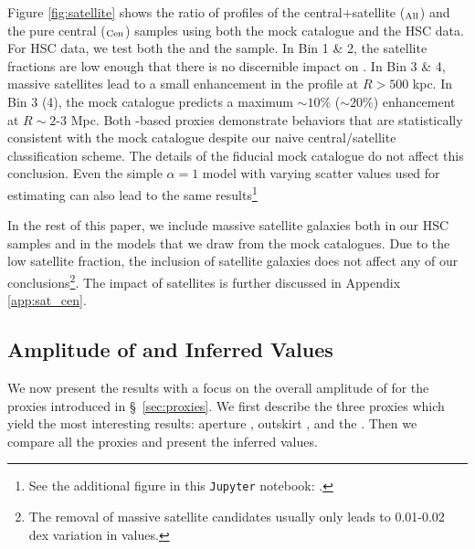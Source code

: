 \documentclass[fleqn,usenatbib,useAMS]{mnras}
\begin{document}
    Figure \ref{fig:satellite} shows the ratio of \dsigma{} profiles of the central$+$satellite 
    (\dsigma{}$_{\rm All}$) and the pure central (\dsigma{}$_{\rm Cen}$) samples using both 
    the mock catalogue and the HSC data.
    For HSC data, we test both the  and the  sample. 
    In Bin 1 \& 2, the satellite fractions are low enough that there is no discernible impact on
    \dsigma{}.
    In Bin 3 \& 4, massive satellites lead to a small enhancement in the \dsigma{} profile at $R >
    500$ kpc.
    In Bin 3 (4), the mock catalogue predicts a maximum $\sim 10$\% ($\sim 20$\%) enhancement at $R
    \sim 2$-3 Mpc.
    Both \mstar{}-based proxies demonstrate behaviors that are statistically consistent with the
    mock catalogue despite our naive central/satellite classification scheme.
    The details of the fiducial mock catalogue do not affect this conclusion. 
    Even the simple $\alpha=1$ model with varying scatter values used for estimating
    \scatterMhaloObsSym{} can also lead to the same results\footnote{See the additional figure in
    this \texttt{Jupyter} notebook: 
    \href{https://github.com/dr-guangtou/jianbing/blob/master/notebooks/figure/fig4.ipynb}{\faGithub}.}

    In the rest of this paper, we include massive satellite galaxies both in our HSC samples and in
    the models that we draw from the mock catalogues. 
    Due to the low satellite fraction, the inclusion of satellite galaxies does not affect any 
    of our conclusions\footnote{The removal of massive satellite candidates usually only leads to
    0.01-0.02 dex variation in \scatterMhaloObsSym{} values.}.
    The impact of satellites is further discussed in Appendix \ref{app:sat_cen}.
    
\subsection{Amplitude of \texorpdfstring{\dsigma{}}{DSigma} and Inferred \texorpdfstring{\sigmvir{}}{SigMvir} Values}
    \label{sec:topn_results}

    We now present the \topn{} results with a focus on the overall amplitude of \dsigma{} for the
    \mvir{} proxies introduced in \S\ \ref{sec:proxies}. 
    We first describe the three proxies which yield the most interesting results: 
    aperture \mstar{}, outskirt \mstar{}, and the \mcmodel{}. 
    Then we compare all the \mvir{} proxies and present the inferred \sigmvir{} values.
\end{document}
